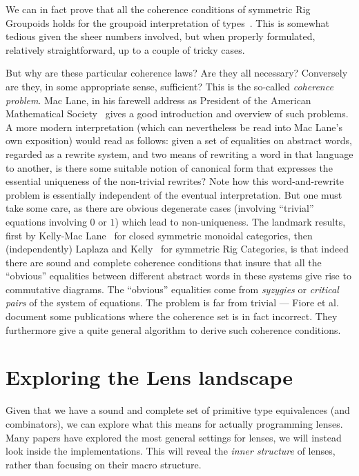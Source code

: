 \documentclass[sigplan,review,anonymous]{acmart}\settopmatter{printfolios=true,printccs=false,printacmref=false}
\begin{document}
We can in fact prove that all the coherence conditions
of symmetric Rig Groupoids holds for the groupoid
interpretation of types~\cite{Carette2016}.  This is somewhat tedious
given the sheer numbers involved, but when properly formulated,
relatively straightforward, up to a couple of tricky cases.

But why are these particular coherence laws? Are they all necessary?
Conversely are they, in some appropriate sense, sufficient? This is
the so-called \emph{coherence problem}. Mac Lane, in his farewell address
as President of the American Mathematical Society~\cite{MacLane1976} gives
a good introduction and overview of such problems.  A more modern
interpretation (which can nevertheless be read into Mac Lane's own
exposition) would read as follows: given a set of equalities on abstract
words, regarded as a rewrite system, and two means of rewriting a word
in that language to another, is there some suitable notion of canonical
form that expresses the essential uniqueness of the non-trivial
rewrites?  Note how this word-and-rewrite problem is essentially
independent of the eventual interpretation. But one must take some care,
as there are obvious degenerate cases (involving ``trivial'' equations
involving $0$ or $1$) which lead to non-uniqueness. The landmark
results, first by Kelly-Mac Lane~\cite{KELLY197197} for closed
symmetric monoidal categories, then (independently) Laplaza and
Kelly~\cite{laplaza72,kelly74} for symmetric Rig Categories, is
that indeed there are sound and complete coherence conditions that
insure that all the ``obvious'' equalities between different abstract
words in these systems give rise to commutative diagrams. The
``obvious'' equalities come from \emph{syzygies} or
\emph{critical pairs} of the system of equations.
The problem is far from trivial --- Fiore et al.~\cite{Fiore-2008}
document some publications where the coherence set is in
fact incorrect. They furthermore give a quite general algorithm
to derive such coherence conditions.

\section{Exploring the Lens landscape}

Given that we have a sound and complete set of primitive type equivalences
(and combinators),
we can explore what this means for actually programming lenses. Many papers
have explored the most general settings for lenses, we will instead look
inside the implementations.  This will
reveal the \emph{inner structure} of lenses, rather than focusing on their
macro structure.
\end{document}
